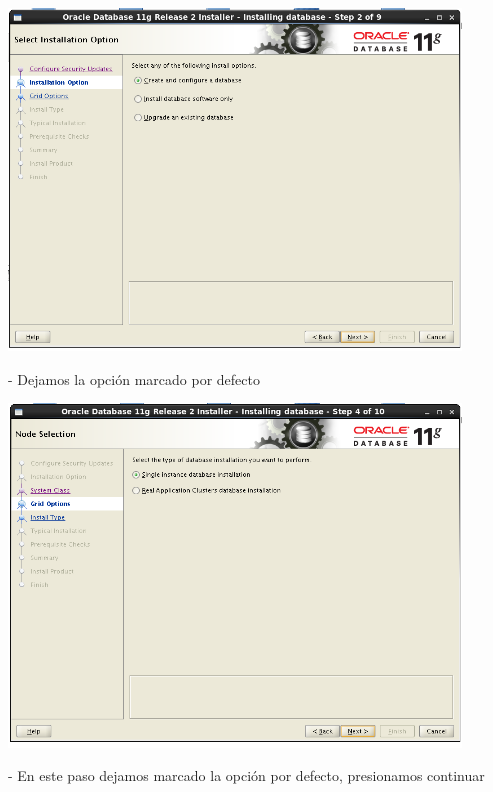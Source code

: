 \documentclass[12pt,letterpaper]{article}
\begin{document}
\begin{center}
	\includegraphics[width=12cm]{./Imagenes/45} 
\end{center}

\begin{itemize}
- Dejamos la opción marcado por defecto \\
\end{itemize}

\begin{center}
	\includegraphics[width=12cm]{./Imagenes/46} 
\end{center}

\begin{itemize}
- En este paso dejamos marcado la opción por defecto, presionamos continuar \\
\end{itemize}
\end{document}
